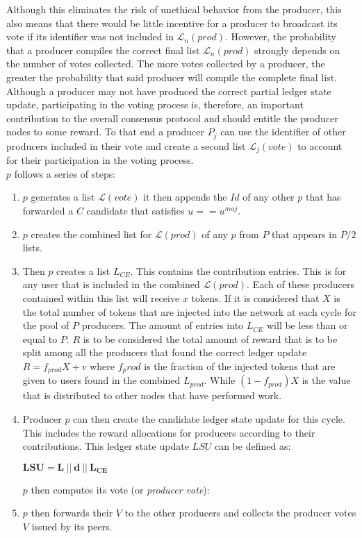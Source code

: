 \documentclass{article}
\begin{document}
Although this eliminates the risk of unethical behavior from the producer, this also means that there would be little incentive for a producer to broadcast its vote if its identifier was not included in $\mathcal{L}_n(prod)$. However, the probability that a producer compiles the correct final list $\mathcal{L}_n(prod)$ strongly depends on the number of votes collected. The more votes collected by a producer, the greater the probability that said producer will compile the complete final list. Although a producer may not have produced the correct partial ledger state update, participating in the voting process is, therefore, an important contribution to the overall consensus protocol and should entitle the producer nodes to some reward. To that end a producer $P_j$ can use the identifier of other producers included in their vote and create a second list $\mathcal{L}_j(vote)$ to account for their participation in the voting process. \\

$p$ follows a series of steps:

\begin{enumerate}
\item $p$ generates a list $\mathcal{L}(vote)$ it then appends the $Id$ of any other $p$ that has forwarded a $C$ candidate that satisfies $u == u^{maj}$.
\item $p$ creates the combined list for $\mathcal{L}(prod)$ of any $p$ from $P$ that appears in $P/2$ lists.
\item Then $p$ creates a list $L_{CE}$. This contains the contribution entries. This is for any user that is included in the combined $\mathcal{L}(prod)$. Each of these producers contained within this list will receive $x$ tokens. If it is considered that $X$ is the total number of tokens that are injected into the network at each cycle for the pool of $P$ producers. The amount of entries into $L_{CE}$ will be less than or equal to $P$. $R$ is to be considered the total amount of reward that is to be split among all the producers that found the correct ledger update $R = f_{prod}X + v$ where $f_prod$ is the fraction of the injected tokens that are given to users found in the combined $L_{prod}$. While $(1-f_{prod})X$ is the value that is distributed to other nodes that have performed work.
\item Producer $p$ can then create the candidate ledger state update for this cycle. This includes the reward allocations for producers according to their contributions. This ledger state update $LSU$ can be defined as:

\begin{center}
$\mathbf{LSU = L~||~d~||~L_{CE}}$
\end{center}


$p$ then computes its vote (or \textit{producer vote}):
\begin{center}
\end{center}


\item $p$ then forwards their $V$ to the other producers and collects the producer votes $V$ issued by its peers.

\end{enumerate}
\end{document}
